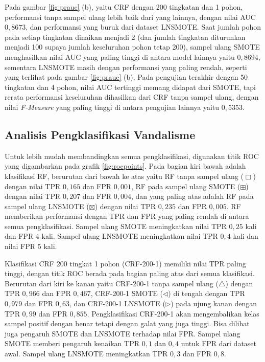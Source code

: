 Pada gambar \ref{fig:prauc} (b), yaitu CRF dengan 200 tingkatan dan 1 pohon,
performansi tanpa sampel ulang lebih baik dari yang lainnya, dengan nilai AUC
$0,8673$, dan performansi yang buruk dari dataset LNSMOTE.
Saat jumlah pohon pada setiap tingkatan dinaikan menjadi 2 (dan jumlah
tingkatan diturunkan menjadi 100 supaya jumlah keseluruhan pohon tetap 200),
sampel ulang SMOTE menghasilkan nilai AUC yang paling tinggi di antara
model lainnya yaitu $0,8694$, sementara LNSMOTE masih dengan performansi yang
paling rendah, seperti yang terlihat pada gambar \ref{fig:prauc} (b).
Pada pengujian terakhir dengan 50 tingkatan dan 4 pohon, nilai AUC tertinggi
memang didapat dari SMOTE, tapi rerata performansi keseluruhan dihasilkan dari
CRF tanpa sampel ulang, dengan nilai \textit{F-Measure} yang paling tinggi
di antara pengujian lainnya yaitu $0,5353$.



\subsection{Analisis Pengklasifikasi Vandalisme}

Untuk lebih mudah membandingkan semua pengklasifikasi, digunakan titik
ROC yang digambarkan pada grafik \ref{fig:rocpoints}.
Pada bagian kiri bawah adalah klasifikasi RF, berurutan dari bawah ke atas
yaitu RF tanpa sampel ulang ($\Box$) dengan nilai TPR $0,165$ dan FPR $0,001$,
RF pada sampel ulang SMOTE ($\boxplus$) dengan nilai TPR $0,207$ dan FPR
$0,004$, dan yang
paling atas adalah RF pada sampel ulang LNSMOTE ($\boxtimes$) dengan nilai TPR
$0,235$ dan FPR $0,005$.
RF memberikan performansi dengan TPR dan FPR yang paling rendah di antara semua
pengklasifikasi.
Sampel ulang SMOTE meningkatkan nilai TPR $0,25$ kali dan FPR 4 kali.
Sampel ulang LNSMOTE meningkatkan nilai TPR $0,4$ kali dan nilai FPR 5 kali.

Klasifikasi CRF 200 tingkat 1 pohon (CRF-200-1) memiliki nilai TPR paling
tinggi, dengan titik ROC berada pada bagian paling atas dari semua klasifikasi.
Berurutan dari kiri ke kanan yaitu CRF-200-1 tanpa sampel ulang ($\triangle$)
dengan TPR $0,966$ dan FPR $0,467$, CRF-200-1 SMOTE ($\triangleleft$) di tengah
dengan TPR $0,979$ dan FPR $0,63$, dan CRF-200-1 LNSMOTE ($\triangleright$)
pada ujung kanan dengan TPR $0,99$ dan FPR $0,855$.
Pengklasifikasi CRF-200-1 akan mengembalikan kelas sampel positif dengan benar
tetapi dengan galat yang juga tinggi.
Bisa dilihat juga pengaruh SMOTE dan LNSMOTE terhadap nilai FPR.
Sampel ulang SMOTE memberi pengaruh kenaikan TPR $0,1$ dan $0,4$ untuk FPR dari
dataset awal.
Sampel ulang LNSMOTE meningkatkan TPR $0,3$ dan FPR $0,8$.

